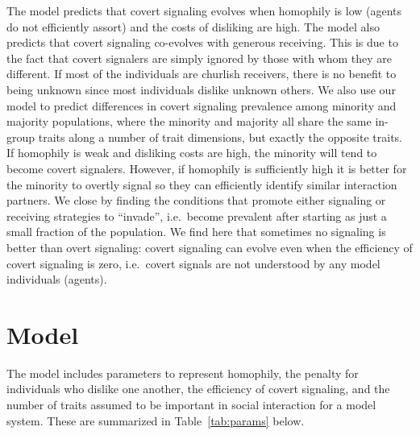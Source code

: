 \documentclass[11pt,letterpaper]{article}
\begin{document}
The model predicts that covert signaling evolves when homophily is low (agents
do not efficiently assort) and the costs of disliking are high. The model also 
predicts that covert signaling co-evolves with generous receiving. This is due
to the fact that covert signalers are simply ignored by those with whom
they are different. If most of the individuals are churlish receivers, there is
no benefit to being unknown since most individuals dislike unknown others. 
We also use our model to predict differences in covert signaling prevalence
among minority and majority populations, where the minority and majority all
share the same in-group traits along a number of trait dimensions, but exactly
the opposite traits. If homophily is weak and disliking costs are high, the
minority will tend to become covert signalers. However, if homophily is
sufficiently high it is better for the minority to overtly signal so they can
efficiently identify similar interaction partners. We close by finding the
conditions that promote either signaling or receiving strategies to ``invade'',
i.e.\ become prevalent after starting as just a small fraction of the population.
We find here that sometimes no signaling is better than overt signaling: 
covert signaling can evolve even when the efficiency of covert signaling is
zero, i.e.\ covert signals are not understood by any model individuals (agents).

\section{Model}

The model includes parameters to represent homophily, the penalty for 
individuals who dislike one another, the efficiency of covert signaling, and the
number of traits assumed to be important in social interaction for a model system.
These are summarized in Table~\ref{tab:params} below.
\end{document}
